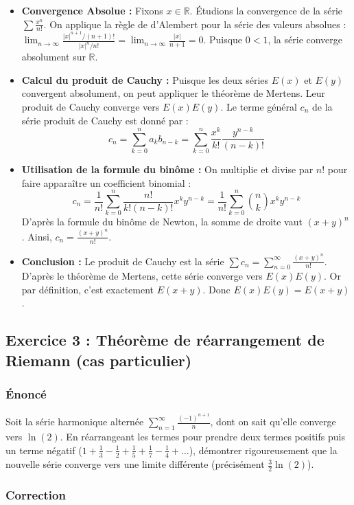 \documentclass[12pt,a4paper]{report}
\begin{document}
\begin{itemize}
\item \textbf{Convergence Absolue :} Fixons $x \in \mathbb{R}$. Étudions la convergence de la série $\sum \frac{x^n}{n!}$. On applique la règle de d'Alembert pour la série des valeurs absolues :
   $\lim_{n\to\infty} \frac{|x|^{n+1}/(n+1)!}{|x|^n/n!} = \lim_{n\to\infty} \frac{|x|}{n+1} = 0$.
   Puisque $0 < 1$, la série converge absolument sur $\mathbb{R}$.
\item \textbf{Calcul du produit de Cauchy :} Puisque les deux séries $E(x)$ et $E(y)$ convergent absolument, on peut appliquer le théorème de Mertens. Leur produit de Cauchy converge vers $E(x)E(y)$.
   Le terme général $c_n$ de la série produit de Cauchy est donné par :
   $$c_n = \sum_{k=0}^n a_k b_{n-k} = \sum_{k=0}^n \frac{x^k}{k!} \frac{y^{n-k}}{(n-k)!}$$
\item \textbf{Utilisation de la formule du binôme :} On multiplie et divise par $n!$ pour faire apparaître un coefficient binomial :
   $$c_n = \frac{1}{n!} \sum_{k=0}^n \frac{n!}{k!(n-k)!} x^k y^{n-k} = \frac{1}{n!} \sum_{k=0}^n \binom{n}{k} x^k y^{n-k}$$
   D'après la formule du binôme de Newton, la somme de droite vaut $(x+y)^n$. Ainsi, $c_n = \frac{(x+y)^n}{n!}$.
\item \textbf{Conclusion :} Le produit de Cauchy est la série $\sum c_n = \sum_{n=0}^\infty \frac{(x+y)^n}{n!}$. D'après le théorème de Mertens, cette série converge vers $E(x)E(y)$. Or par définition, c'est exactement $E(x+y)$. Donc $E(x)E(y) = E(x+y)$.
\end{itemize}


\subsection{Exercice 3 : Théorème de réarrangement de Riemann (cas particulier)}

\subsubsection{Énoncé}
Soit la série harmonique alternée $\sum_{n=1}^\infty \frac{(-1)^{n+1}}{n}$, dont on sait qu'elle converge vers $\ln(2)$.
En réarrangeant les termes pour prendre deux termes positifs puis un terme négatif ($1 + \frac{1}{3} - \frac{1}{2} + \frac{1}{5} + \frac{1}{7} - \frac{1}{4} + \dots$), démontrer rigoureusement que la nouvelle série converge vers une limite différente (précisément $\frac{3}{2}\ln(2)$).

\subsubsection{Correction}
\end{document}
